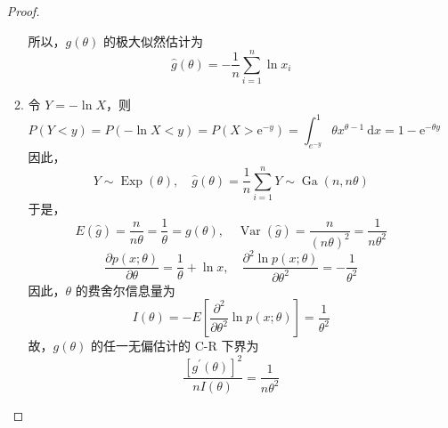 \documentclass[normal,founder,mtpro2,cn]{elegantnote}
\begin{document}
\begin{enumerate}
\begin{proof}
\begin{enumerate}
\begin{equation*}
                      \end{equation*}
                      所以，$g\left(\theta\right)$ 的极大似然估计为
                      \begin{equation*}
                          \hat{g}\left(\theta\right)=-\frac{1}{n}\sum_{i=1}^{n}\ln x_{i}
                      \end{equation*}
                \item 令 $Y=-\ln X$，则
                      \begin{equation*}
                          P\left(Y<y\right)=P\left(-\ln X<y\right)=P\left(X>\mathrm{e}^{-y}\right)=\int_{e^{-y}}^{1} \theta x^{\theta-1} \mathrm{~d} x=1-\mathrm{e}^{-\theta y}
                      \end{equation*}
                      因此，
                      \begin{equation*}
                          Y\sim\operatorname{Exp}(\theta),\quad\hat{g}\left(\theta\right)=\frac{1}{n}\sum_{i=1}^{n}Y\sim\operatorname{Ga}\left(n,n\theta\right)
                      \end{equation*}
                      于是，
                      \begin{equation*}
                          E\left(\hat{g}\right)=\frac{n}{n\theta}=\frac{1}{\theta}=g(\theta),\quad\operatorname{Var}\left(\hat{g}\right)=\frac{n}{\left(n\theta\right)^{2}}=\frac{1}{n\theta^{2}}
                      \end{equation*}
                      \begin{equation*}
                          \frac{\partial p\left(x;\theta\right)}{\partial \theta}=\frac{1}{\theta}+\ln x,\quad\frac{\partial^{2}\ln p\left(x;\theta\right)}{\partial\theta^{2}}=-\frac{1}{\theta^{2}}
                      \end{equation*}
                      因此，$\theta$ 的费舍尔信息量为
                      \begin{equation*}
                          I\left(\theta\right)=-E\left[\frac{\partial^{2}}{\partial\theta^{2}}\ln p\left(x;\theta\right)\right]=\frac{1}{\theta^{2}}
                      \end{equation*}
                      故，$g\left(\theta\right)$ 的任一无偏估计的 C-R 下界为
                      \begin{equation*}
                          \frac{\left[g^{\prime}\left(\theta\right)\right]^{2}}{nI\left(\theta\right)}=\frac{1}{n\theta^{2}}
                      \end{equation*}

\end{enumerate}
\end{proof}
\end{enumerate}
\end{document}
